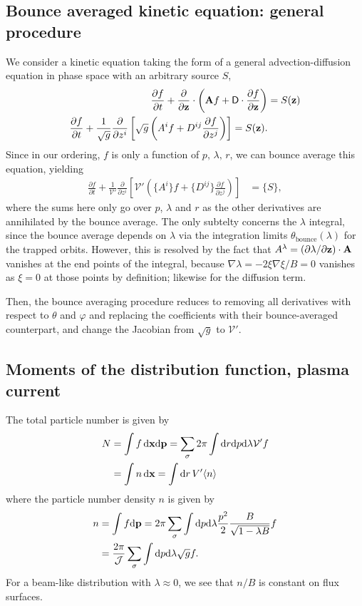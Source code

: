 \documentclass[11pt,a4paper]{article}
\newcommand{\rd}{\ensuremath{\mathrm{d}}}
\newcommand{\sub}[1]{\ensuremath{_{\text{#1}}}}
\renewcommand{\b}[1]{\ensuremath{ {\bf #1 } }}
\begin{document}
\subsection{Bounce averaged kinetic equation: general procedure}
We consider a kinetic equation taking the form of a general advection-diffusion equation in phase space with an arbitrary source $S$,
\begin{align}
\frac{\partial f}{\partial t} + \frac{\partial}{\partial \b{z}} \cdot \left( \b{A} f + \mathsf{D}\cdot \frac{\partial f}{\partial \b{z}}\right) &= S(\b{z}) \nonumber \\
\frac{\partial f}{\partial t} + \frac{1}{\sqrt{g}}\frac{\partial}{\partial z^i}\left[ \sqrt{g} \left( A^i f +  D^{ij}\frac{\partial f}{\partial z^j}\right)\right] = S(\b{z}).
\end{align}
Since in our ordering, $f$ is only a function of $p,\,\lambda,\,r$, we can bounce average this equation, yielding
\begin{align}
\frac{\partial f}{\partial t} + \frac{1}{\mathcal{V}'}\frac{\partial}{\partial z^i} \left[ \mathcal{V}'\left( \{A^i\} f + \{D^{ij}\} \frac{\partial f}{\partial z^j} \right)\right] &= \{S\},
\end{align} 
where the sums here only go over $p$, $\lambda$ and $r$ as the other derivatives are annihilated by the bounce average. The only subtelty concerns the $\lambda$ integral, since the bounce average depends on $\lambda$ via the integration limits $\theta\sub{bounce}(\lambda)$ for the trapped orbits. However, this is resolved by the fact that $A^\lambda = (\partial\lambda/\partial \b{z}) \cdot \b{A}$ vanishes at the end points of the integral, because  $\nabla \lambda = -2\xi\nabla \xi/B = 0$ vanishes as $\xi=0$ at those points by definition; likewise for the diffusion term.

Then, the bounce averaging procedure reduces to removing all derivatives with respect to $\theta$ and $\varphi$ and replacing the coefficients with their bounce-averaged counterpart, and change the Jacobian from $\sqrt{g}$ to $\mathcal{V}'$.


\subsection{Moments of the distribution function, plasma current}
The total particle number is given by 
\begin{align}
N &= \int f \, \rd \b{x} \rd \b{p}  = \sum_\sigma 2\pi\int \rd r \rd p \rd \lambda \mathcal{V}' f \nonumber \\
&= \int n \,\rd\b{x} = \int \rd r \, V' \langle n \rangle
\end{align}
where the particle number density $n$ is given by
\begin{align}
n &= \int f \rd \b{p} = 2\pi \sum_\sigma \int \rd p \rd\lambda \frac{p^2}{2}\frac{B}{\sqrt{1-\lambda B}} f \nonumber \\
&=\frac{2\pi}{\mathcal{J}} \sum_\sigma \int \rd p \rd\lambda \sqrt{g}f.
\end{align}
For a beam-like distribution with $\lambda \approx 0$, we see that $n/B$ is constant on flux surfaces.
\end{document}
